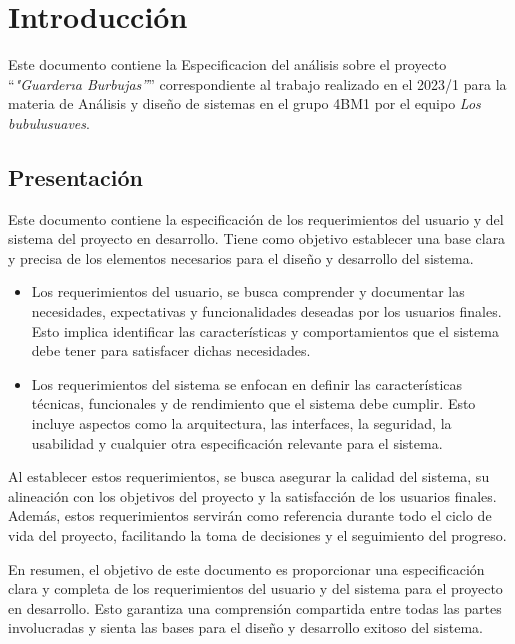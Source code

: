 \chapter{Introducción}

	Este documento contiene la Especificacion del análisis sobre el proyecto ``{\em "Guarderıa Burbujas”}'' correspondiente al trabajo realizado en el 2023/1 para la materia de Análisis y diseño de sistemas en el grupo 4BM1 por el equipo {\em Los bubulusuaves}.

\section{Presentación}
Este documento contiene la especificación de los requerimientos del usuario y del sistema del proyecto en desarrollo. Tiene como objetivo establecer una base clara y precisa de los elementos necesarios para el diseño y desarrollo del sistema.

\begin{itemize}
    \item Los requerimientos del usuario, se busca comprender y documentar las necesidades, expectativas y funcionalidades deseadas por los usuarios finales. Esto implica identificar las características y comportamientos que el sistema debe tener para satisfacer dichas necesidades.

    \item Los requerimientos del sistema se enfocan en definir las características técnicas, funcionales y de rendimiento que el sistema debe cumplir. Esto incluye aspectos como la arquitectura, las interfaces, la seguridad, la usabilidad y cualquier otra especificación relevante para el sistema.
\end{itemize}

Al establecer estos requerimientos, se busca asegurar la calidad del sistema, su alineación con los objetivos del proyecto y la satisfacción de los usuarios finales. Además, estos requerimientos servirán como referencia durante todo el ciclo de vida del proyecto, facilitando la toma de decisiones y el seguimiento del progreso.

En resumen, el objetivo de este documento es proporcionar una especificación clara y completa de los requerimientos del usuario y del sistema para el proyecto en desarrollo. Esto garantiza una comprensión compartida entre todas las partes involucradas y sienta las bases para el diseño y desarrollo exitoso del sistema.
 
